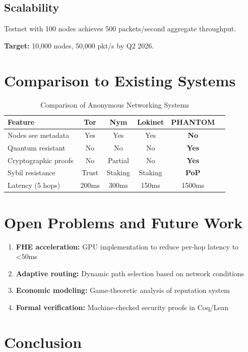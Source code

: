 \documentclass[11pt]{article}
\begin{document}
\subsection{Scalability}

Testnet with 100 nodes achieves 500 packets/second aggregate throughput.

\textbf{Target:} 10,000 nodes, 50,000 pkt/s by Q2 2026.

\section{Comparison to Existing Systems}

\begin{table}[h]
\centering
\small
\begin{tabular}{|l|c|c|c|c|c|}
\hline
\textbf{Feature} & \textbf{Tor} & \textbf{Nym} & \textbf{Lokinet} & \textbf{PHANTOM} \\
\hline
Nodes see metadata & Yes & Yes & Yes & \textbf{No} \\
Quantum resistant & No & No & No & \textbf{Yes} \\
Cryptographic proofs & No & Partial & No & \textbf{Yes} \\
Sybil resistance & Trust & Staking & Staking & \textbf{PoP} \\
Latency (5 hops) & 200ms & 300ms & 150ms & 1500ms \\
\hline
\end{tabular}
\caption{Comparison of Anonymous Networking Systems}
\end{table}

\section{Open Problems and Future Work}

\begin{enumerate}
\item \textbf{FHE acceleration:} GPU implementation to reduce per-hop latency to <50ms
\item \textbf{Adaptive routing:} Dynamic path selection based on network conditions
\item \textbf{Economic modeling:} Game-theoretic analysis of reputation system
\item \textbf{Formal verification:} Machine-checked security proofs in Coq/Lean
\end{enumerate}

\section{Conclusion}
\end{document}
